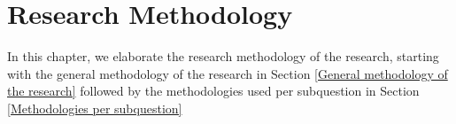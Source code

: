 \documentclass[12pt]{scrreprt}
\begin{document}
\chapter{Research Methodology}
\label{Research Methodology}
In this chapter, we elaborate the research methodology of the research, starting with the general methodology of the research in Section \ref{General methodology of the research} followed by the methodologies used per subquestion in Section \ref{Methodologies per subquestion}
\end{document}
